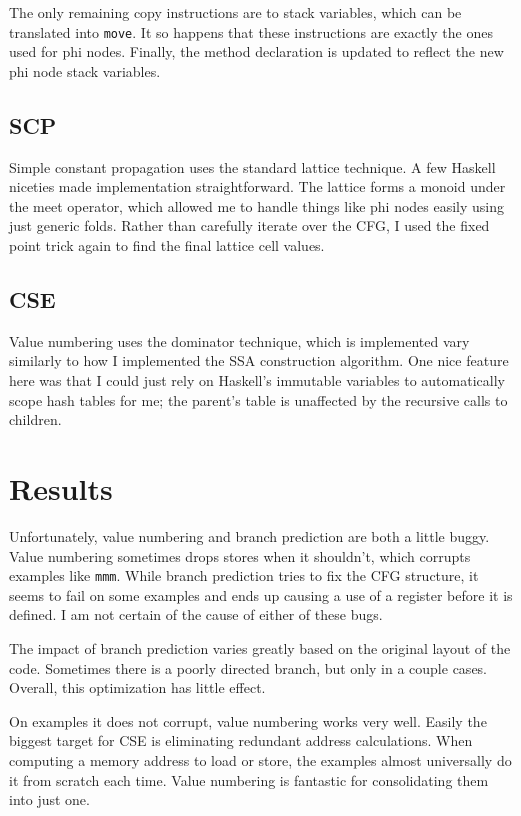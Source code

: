 \documentclass{article}
\begin{document}
The only remaining copy instructions are to stack variables, which can be translated into \texttt{move}.
It so happens that these instructions are exactly the ones used for phi nodes.
Finally, the method declaration is updated to reflect the new phi node stack variables.

\subsection{SCP}
Simple constant propagation uses the standard lattice technique.
A few Haskell niceties made implementation straightforward.
The lattice forms a monoid under the meet operator, 
which allowed me to handle things like phi nodes easily using just generic folds.
Rather than carefully iterate over the CFG, 
I used the fixed point trick again to find the final lattice cell values.

\subsection{CSE}
Value numbering uses the dominator technique, 
which is implemented vary similarly to how I implemented the SSA construction algorithm.
One nice feature here was that I could just rely on Haskell's immutable variables to automatically
scope hash tables for me; the parent's table is unaffected by the recursive calls to children.

\section{Results}
Unfortunately, value numbering and branch prediction are both a little buggy.
Value numbering sometimes drops stores when it shouldn't, which corrupts examples like \texttt{mmm}.
While branch prediction tries to fix the CFG structure, 
it seems to fail on some examples and ends up causing a use of a register before it is defined.
I am not certain of the cause of either of these bugs.

The impact of branch prediction varies greatly based on the original layout of the code.
Sometimes there is a poorly directed branch, but only in a couple cases.
Overall, this optimization has little effect.

On examples it does not corrupt, value numbering works very well.
Easily the biggest target for CSE is eliminating redundant address calculations.
When computing a memory address to load or store, 
the examples almost universally do it from scratch each time.
Value numbering is fantastic for consolidating them into just one.
\end{document}
